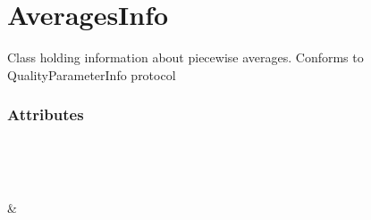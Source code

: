 \documentclass[letterpaper,10pt,english]{sphinxmanual}
\begin{document}
\section{AveragesInfo}
\label{\detokenize{generated/quality_assessment.data_types.AveragesInfo:averagesinfo}}\label{\detokenize{generated/quality_assessment.data_types.AveragesInfo::doc}}

\begin{fulllineitems}
\label{\detokenize{generated/quality_assessment.data_types.AveragesInfo:quality_assessment.data_types.AveragesInfo}}
\sphinxAtStartPar
Class holding information about piecewise averages.
Conforms to QualityParameterInfo protocol
\subsubsection*{Attributes}


\begin{savenotes}\sphinxatlongtablestart\begin{longtable}[c]{}
\hline

\endfirsthead

%
{}\\
\hline

\endhead

\hline
{}\\
\endfoot

\endlastfoot

\sphinxAtStartPar
{\hyperref[\detokenize{generated/quality_assessment.data_types.AveragesInfo.center_position:quality_assessment.data_types.AveragesInfo.center_position}]{}}
&
\sphinxAtStartPar


\end{longtable}
\end{savenotes}
\end{fulllineitems}
\end{document}

